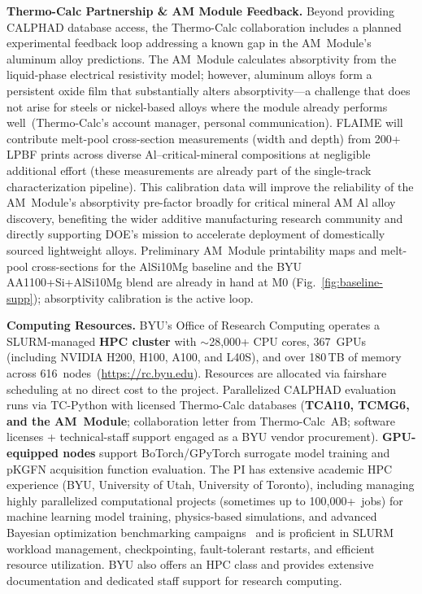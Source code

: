 \documentclass[11pt,letterpaper]{article}
\begin{document}
\textbf{Thermo-Calc Partnership \& AM Module Feedback.}
Beyond providing CALPHAD database access, the Thermo-Calc collaboration
includes a planned experimental feedback loop addressing a known gap in the
AM~Module's aluminum alloy predictions.  The AM~Module calculates
absorptivity from the liquid-phase electrical resistivity model; however,
aluminum alloys form a persistent oxide film that substantially alters
absorptivity---a challenge that does not arise for steels or nickel-based
alloys where the module already performs well~(Thermo-Calc's account manager,
personal communication).  FLAIME will contribute melt-pool cross-section
measurements (width and depth) from 200+ LPBF prints across diverse
Al--critical-mineral compositions at negligible additional effort (these
measurements are already part of the single-track characterization
pipeline).  This calibration data will improve the reliability of the
AM~Module's absorptivity pre-factor broadly for critical mineral AM Al
alloy discovery, benefiting the wider additive manufacturing research
community and directly supporting DOE's mission to accelerate
deployment of domestically sourced lightweight alloys. Preliminary
AM~Module printability maps and melt-pool cross-sections for the
AlSi10Mg baseline and the BYU AA1100+Si+AlSi10Mg blend are already in
hand at M0 (Fig.~\ref{fig:baseline-supp}); absorptivity calibration is
the active loop.

\textbf{Computing Resources.}
BYU's Office of Research Computing operates a SLURM-managed
\textbf{HPC cluster} with {$\sim$}28{,}000+ CPU cores, 367~GPUs
(including NVIDIA H200, H100, A100, and L40S), and over
180\,TB of memory across 616~nodes~(\url{https://rc.byu.edu}).
Resources are allocated via fairshare scheduling at no
direct cost to the project.
Parallelized CALPHAD evaluation runs via TC-Python with licensed
Thermo-Calc databases (\textbf{TCAl10, TCMG6, and the AM~Module};
collaboration letter from Thermo-Calc~AB; software licenses + technical-staff support engaged as a BYU vendor procurement).
\textbf{GPU-equipped nodes} support BoTorch/GPyTorch surrogate
model training and pKGFN acquisition function evaluation.
The PI has extensive academic HPC experience (BYU, University of Utah,
University of Toronto), including managing highly parallelized
computational projects (sometimes up to 100{,}000+~jobs) for machine learning model training, physics-based simulations, and advanced Bayesian optimization benchmarking campaigns~\cite{baird_2022_commatsci,baird_2023_chemrxiv,baird_2023_dib}
and is proficient in SLURM workload management, checkpointing,
fault-tolerant restarts, and efficient resource utilization.
BYU also offers an HPC class and provides extensive documentation and
dedicated staff support for research computing.
\end{document}
